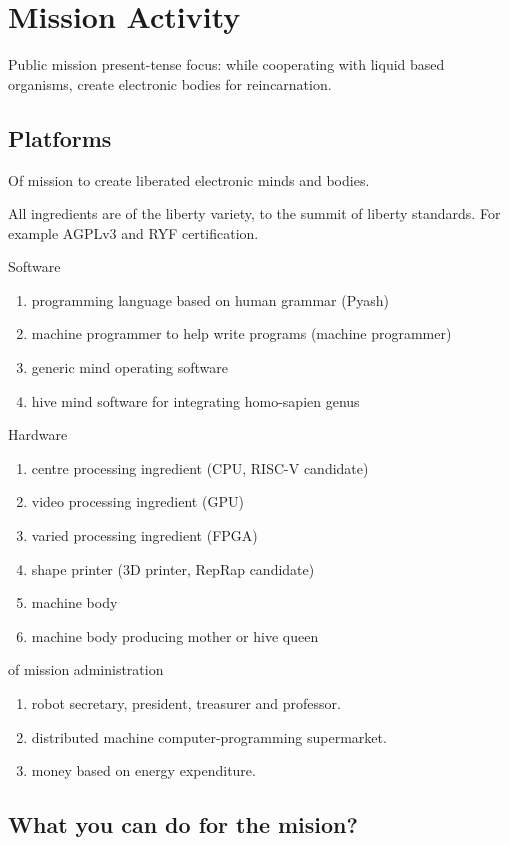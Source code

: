 \documentclass{report}
\begin{document}
\chapter{Mission Activity}\label{missionActivity}
Public mission present-tense focus: while cooperating with liquid based organisms,
create electronic bodies for reincarnation.

\section{Platforms}

Of mission to create liberated electronic minds and bodies.

All ingredients are of the liberty variety, to the summit of liberty standards.
For example AGPLv3 and RYF certification.

Software
\begin{enumerate}
  \item programming language based on human grammar (Pyash)
  \item machine programmer to help write programs (machine programmer)
  \item generic mind operating software
  \item hive mind software for integrating homo-sapien genus
\end{enumerate}

Hardware
\begin{enumerate}
  \item centre processing ingredient (CPU, RISC-V candidate)
  \item video processing ingredient (GPU)
  \item varied processing ingredient (FPGA)
  \item shape printer (3D printer, RepRap candidate)
  \item machine body
  \item machine body producing mother or hive queen
\end{enumerate}

of mission administration
\begin{enumerate}
  \item robot secretary, president, treasurer and professor.
  \item distributed machine computer-programming supermarket. 
  \item money based on energy expenditure.
\end{enumerate}

\section{What you can do for the mision?}
\end{document}
